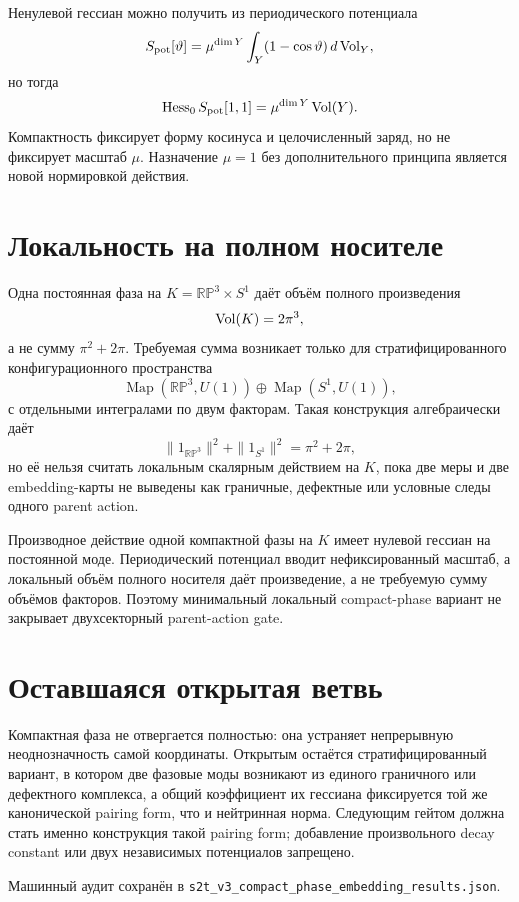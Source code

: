 Ненулевой гессиан можно получить из периодического потенциала
\begin{equation}
 S_{\mathrm{pot}}[\vartheta]
 =\mu^{\dim Y}\int_Y(1-\cos\vartheta)\,d\operatorname{Vol}_Y,
\end{equation}
но тогда
\begin{equation}
 \operatorname{Hess}_0S_{\mathrm{pot}}[1,1]
 =\mu^{\dim Y}\operatorname{Vol}(Y).
\end{equation}
Компактность фиксирует форму косинуса и целочисленный заряд, но не фиксирует
масштаб \(\mu\). Назначение \(\mu=1\) без дополнительного принципа является
новой нормировкой действия.

\section{Локальность на полном носителе}

Одна постоянная фаза на
\(K=\mathbb{RP}^3\times S^1\) даёт объём полного произведения
\begin{equation}
 \operatorname{Vol}(K)=2\pi^3,
\end{equation}
а не сумму \(\pi^2+2\pi\). Требуемая сумма возникает только для
стратифицированного конфигурационного пространства
\begin{equation}
 \operatorname{Map}(\mathbb{RP}^3,U(1))
 \oplus\operatorname{Map}(S^1,U(1)),
\end{equation}
с отдельными интегралами по двум факторам. Такая конструкция алгебраически
даёт
\begin{equation}
 \|1_{\mathbb{RP}^3}\|^2+\|1_{S^1}\|^2=\pi^2+2\pi,
\end{equation}
но её нельзя считать локальным скалярным действием на \(K\), пока две меры
и две embedding-карты не выведены как граничные, дефектные или условные
следы одного parent action.

\begin{nogocriterion}
Производное действие одной компактной фазы на \(K\) имеет нулевой гессиан
на постоянной моде. Периодический потенциал вводит нефиксированный масштаб,
а локальный объём полного носителя даёт произведение, а не требуемую сумму
объёмов факторов. Поэтому минимальный локальный compact-phase вариант не
закрывает двухсекторный parent-action gate.
\end{nogocriterion}

\section{Оставшаяся открытая ветвь}

Компактная фаза не отвергается полностью: она устраняет непрерывную
неоднозначность самой координаты. Открытым остаётся стратифицированный
вариант, в котором две фазовые моды возникают из единого граничного или
дефектного комплекса, а общий коэффициент их гессиана фиксируется той же
канонической pairing form, что и нейтринная норма. Следующим гейтом должна
стать именно конструкция такой pairing form; добавление произвольного
decay constant или двух независимых потенциалов запрещено.

Машинный аудит сохранён в
\texttt{s2t\_v3\_compact\_phase\_embedding\_results.json}.